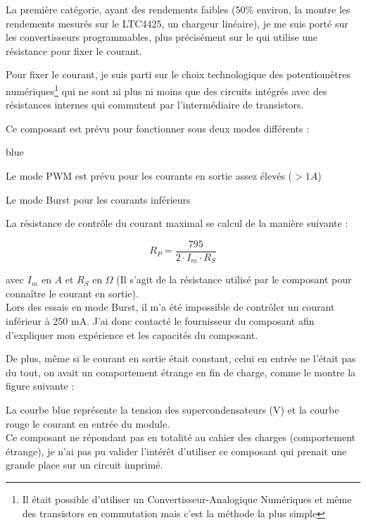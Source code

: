 La première catégorie, ayant des rendements faibles (50\% environ, la  montre les rendements mesurés sur le LTC4425, un chargeur linéaire), je me suis porté sur les convertisseurs programmables, plus précisément sur le  qui utilise une résistance pour fixer le courant. \\


Pour fixer le courant, je suis parti sur le choix technologique des potentiomètres numériques\footnote{Il était possible d'utiliser un Convertisseur-Analogique Numériques et même des transistors en commutation mais c'est la méthode la plus simple} qui ne sont ni plus ni moins que des circuits intégrés avec des résistances internes qui commutent par l'intermédiaire de transistors.

Ce composant est prévu pour fonctionner sous deux modes différents : 


\begin{items}{blue}{\Circle}
    \item Le mode PWM est prévu pour les courants en sortie assez élevés ($> 1A$)
    \item Le mode Burst pour les courants inférieurs
\end{items}


La résistance de contrôle du courant maximal se calcul de la manière suivante : 

  $$ R_{P} = \frac{795}{2\cdot I_{m}\cdot R_{S}}  $$
  
  avec $I_{m}$ en $A$ et $R_S$ en $\Omega$ (Il s'agit de la résistance  utilisé par le composant pour connaître le courant en sortie).\\
  
 
Lors des essais en mode Burst, il m'a été impossible de contrôler un courant inférieur à 250 mA. J'ai donc contacté le fournisseur du composant afin d'expliquer mon expérience et les capacités du composant.

De plus, même si le courant en sortie était constant, celui en entrée ne l'était pas du tout, on avait un comportement étrange en fin de charge, comme le montre la figure suivante : 


La courbe blue représente la tension des supercondensateurs (V) et la courbe rouge le courant en entrée du module.\\

Ce composant ne répondant pas en totalité au cahier des charges (comportement étrange), je  n'ai pas pu valider l'intérêt d'utiliser ce composant qui prenait une grande place sur un circuit imprimé.

